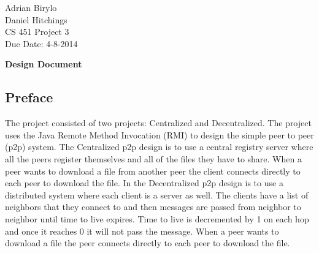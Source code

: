 \documentclass{article}
\begin{document}
\begin{flushright}
Adrian Birylo\\
Daniel Hitchings\\
CS 451 Project 3\\
Due Date: 4-8-2014\\
\end{flushright}

\begin{center}
\textbf{\huge{Design Document}}
\end{center}



\subsection*{Preface}
The project consisted of two projects: Centralized and Decentralized. The project uses the Java Remote Method Invocation (RMI) to design the simple peer to peer (p2p) system. The Centralized p2p design is to use a central registry server where all the peers register themselves and all of the files they have to share. When a peer wants to download a file from another peer the client connects directly to each peer to download the file. In the Decentralized p2p design is to use a distributed system where each client is a server as well. The clients have a list of neighbors that they connect to and then messages are passed from neighbor to neighbor until time to live expires. Time to live is decremented by 1 on each hop and once it reaches 0 it will not pass the message. When a peer wants to download a file the peer connects directly to each peer to download the file. 
\end{document}
